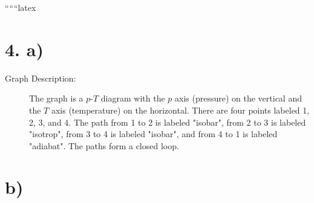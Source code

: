 
``````latex


\section*{4. a)}

\begin{description}
    \item[Graph Description:] The graph is a $p$-$T$ diagram with the $p$ axis (pressure) on the vertical and the $T$ axis (temperature) on the horizontal. There are four points labeled 1, 2, 3, and 4. The path from 1 to 2 is labeled "isobar", from 2 to 3 is labeled "isotrop", from 3 to 4 is labeled "isobar", and from 4 to 1 is labeled "adiabat". The paths form a closed loop.
\end{description}

\section*{b)}

